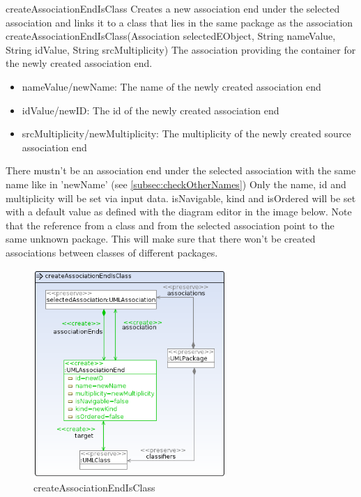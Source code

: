 \op
{createAssociationEndIsClass}
{Creates a new association end under the selected association and links it to a
class that lies in the same package as the association}
{createAssociationEndIsClass(Association
selectedEObject, String nameValue, String idValue, String srcMultiplicity)} {The
association providing the container for the newly created association end.} {
\begin{itemize}
 \item nameValue/newName: The name of the newly created association end
 \item idValue/newID: The id of the newly created association end
 \item srcMultiplicity/newMultiplicity: The multiplicity of the newly created
 source association end
\end{itemize}
}
{There mustn't be an association end under the selected association with the
same name like in 'newName' (see
\ref{subsec:checkOtherNames})}
{Only the name, id and multiplicity will be set via input data. isNavigable,
kind and isOrdered will be set with a default value as defined with the diagram
editor in the image below.
Note that the reference from a class and from the selected association point to
the same unknown package. This will make sure that there won't be created
associations between classes of different packages.}
\begin{figure}[H]
  \centering
  \includegraphics[width=0.65\textwidth]{pics/createAssociationEndIsClass.png}
  \caption{createAssociationEndIsClass}
  \label{createAssociationEndIsClass}
\end{figure}
